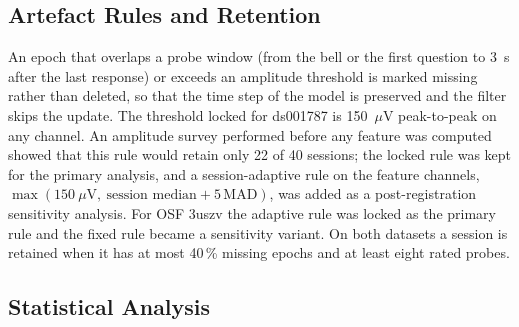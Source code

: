 \subsection{Artefact Rules and Retention}
\label{sec:artefact}
An epoch that overlaps a probe window (from the bell or the first question to 3~s after the last response) or exceeds an amplitude threshold is marked missing rather than deleted, so that the time step of the model is preserved and the filter skips the update. The threshold locked for ds001787 is 150~$\mu$V peak-to-peak on any channel. An amplitude survey performed before any feature was computed showed that this rule would retain only 22 of 40 sessions; the locked rule was kept for the primary analysis, and a session-adaptive rule on the feature channels, $\max(150~\mu\mathrm V,\ \text{session median}+5\,\mathrm{MAD})$, was added as a post-registration sensitivity analysis. For OSF 3uszv the adaptive rule was locked as the primary rule and the fixed rule became a sensitivity variant. On both datasets a session is retained when it has at most 40\,\% missing epochs and at least eight rated probes.

\subsection{Statistical Analysis}
\label{sec:stats}

